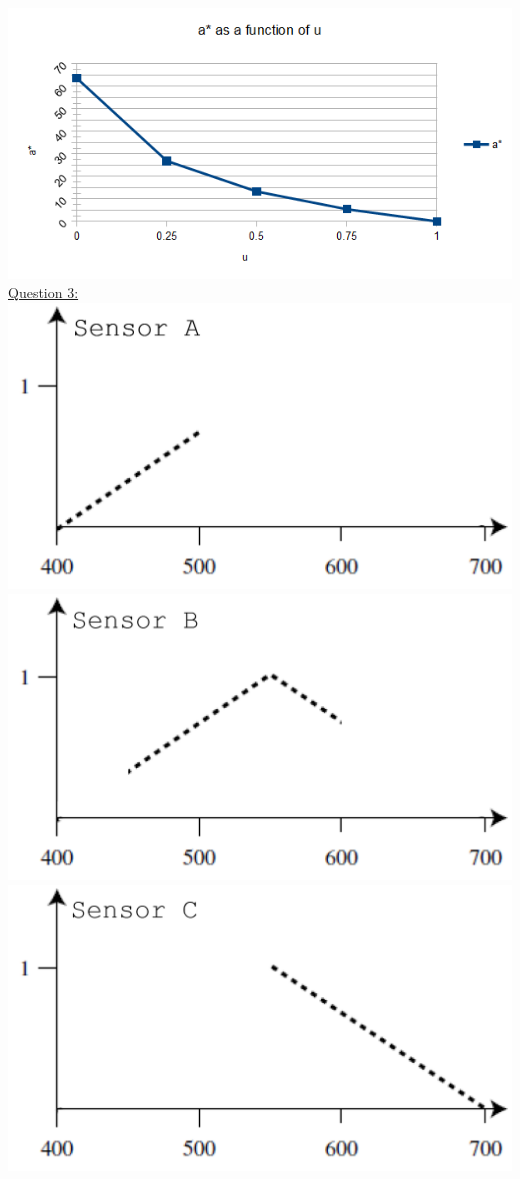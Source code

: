 \documentclass[12pt]{article}\usepackage{amsmath}
\begin{document}
\includegraphics[scale=1]{b.png}
\pagebreak\\
\underline{Question 3:}\\
\includegraphics[scale=1]{SensorA.png}\\
\includegraphics[scale=1]{SensorB.png}\\
\includegraphics[scale=1]{SensorC.png}\\
\end{document}
